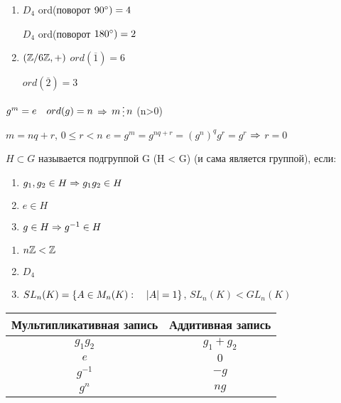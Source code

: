 \documentclass[11pt]{article}
\begin{document}
\begin{instances}
    \begin{enumerate}                               
    	\item $D_4$ ord(поворот $90\degree) =4$
    	
    	$D_4$ ord(поворот $180\degree) =2$
    	\item $(\mathbb{Z} /6 \mathbb{Z}, +)$ $ord(\overline{1})=6$
    	
    	$ord(\overline{2})=3$
	\end{enumerate} 
\end{instances}

\begin{statement}
    $g^m=e \quad ord(g)=n$ $\Rightarrow$ $m \devides n$ (n>0)
\end{statement}
\begin{proofs}
    $m=n q+r$, $0 \leqslant r < n$
    $e=g^m=g^{n q + r}=(g^n)^q g^r=g^r$ $\Rightarrow$ $r=0$
\end{proofs}

\begin{definition}
    $H \subset G$ называется подгруппой G (H < G) (и сама является группой), если:
    \begin{enumerate}                               
    	\item $g_1,g_2 \in H \Rightarrow g_1 g_2 \in H$
    	\item $e \in H$
    	\item $g \in H \Rightarrow g^{-1} \in H$
	\end{enumerate} 
\end{definition}

\begin{instances}
    \begin{enumerate}                               
    	\item $n\mathbb{Z} < \mathbb{Z}$
    	\item $D_4$
    	\item $SL_n(K)=\{A \in M_n(K): \quad |A|=1\}$, $SL_n(K)<GL_n(K)$
	\end{enumerate} 
\end{instances}

\begin{tabular} {c|c}
	Мультипликативная запись & Аддитивная запись\\ \hline 
	$g_1 g_2$ & $g_1 + g_2$\\
	$e$ & $0$\\
	$g^{-1}$ & $-g$\\
    $g^n$ & $ng$ 
\end{tabular}
\end{document}
